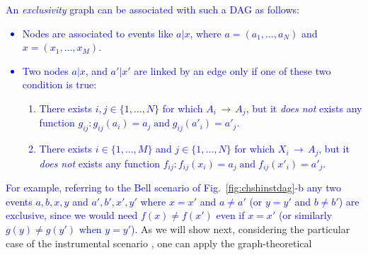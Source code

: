 \documentclass[letterpaper]{article}
\newcommand{\et}{\;\mathrm{and}\;}
\begin{document}
\textcolor{blue}{
An \emph{exclusivity} graph can be associated with such a DAG
as follows:
\begin{itemize}
    \item Nodes are associated to events like $a | x$, where $a = (a_1,\ldots,a_N)$ and  $x = (x_1,\ldots,x_M)$.
    \item Two nodes $a | x $, and $a' | x'$ are linked by an edge only if one of these two condition is true:
        \begin{enumerate}
            \item There exists $i,j \in \{1 ,\ldots,N\}$ for which $A_i\,
                \rightarrow\, A_j$, but it \emph{does not} exists any function $g_{ij} : g_{ij}(a_i) = a_j
                \et g_{ij}(a'_i) = a'_j$.
            \item There exists $i\in \{1,\ldots,M\}$ and $j\in \{1,\ldots,N\}$ for which
                $X_i\,\rightarrow\,A_j$, but it \emph{does not} exists any function $f_{ij} : f_{ij}(x_i) = a_j
                \et f_{ij}(x'_i) = a'_j$.
        \end{enumerate}
\end{itemize}
}
\textcolor{blue}{
For example, referring to the Bell scenario of
Fig.~\ref{fig:chshinstdag}-b any two events $a,b,x,y$ and $a',b',x',y'$
where $x = x'$ and $a\neq a'$ (or $y = y'$ and $b \neq b'$) are exclusive,
since we would need $f(x) \neq f(x')$ even if $x = x'$ (or similarly $g(y)
\neq g(y')$ when $y = y'$).
}
As we will show next, considering the particular case of the instrumental
scenario \cite{pearl1995, bonet2001}, one can apply the graph-theoretical
\end{document}
